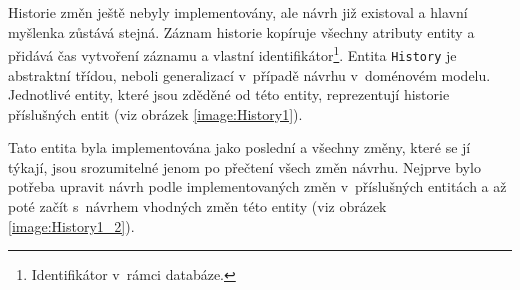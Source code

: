         Historie změn ještě nebyly implementovány, ale návrh již existoval a hlavní myšlenka zůstává stejná. Záznam historie kopíruje všechny atributy entity a přidává čas vytvoření záznamu a vlastní identifikátor\footnote{Identifikátor v~rámci databáze.}. Entita \verb|History| je abstraktní třídou, neboli generalizací v~případě návrhu v~doménovém modelu. Jednotlivé entity, které jsou zděděné od této entity, reprezentují historie příslušných entit (viz obrázek \ref{image:History1}). 
    
        Tato entita byla implementována jako poslední a všechny změny, které se jí týkají, jsou srozumitelné jenom po přečtení všech změn návrhu. Nejprve bylo potřeba upravit návrh podle implementovaných změn v~příslušných entitách a až poté začít s~návrhem vhodných změn této entity (viz obrázek \ref{image:History1_2}).
        
